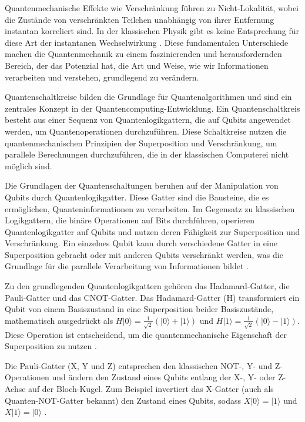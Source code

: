 Quantenmechanische Effekte wie Verschränkung führen zu Nicht-Lokalität, wobei die Zustände von verschränkten 
Teilchen unabhängig von ihrer Entfernung instantan korreliert sind. In der klassischen Physik gibt es keine 
Entsprechung für diese Art der instantanen Wechselwirkung \cite{aspect1982experimental}. Diese fundamentalen Unterschiede 
machen die Quantenmechanik zu einem faszinierenden und herausfordernden Bereich, der das Potenzial hat, 
die Art und Weise, wie wir Informationen verarbeiten und verstehen, grundlegend zu verändern.






Quantenschaltkreise bilden die Grundlage für Quantenalgorithmen und sind ein zentrales Konzept in der 
Quantencomputing-Entwicklung. Ein Quantenschaltkreis besteht aus einer Sequenz von Quantenlogikgattern, 
die auf Qubits angewendet werden, um Quantenoperationen durchzuführen. Diese Schaltkreise nutzen die 
quantenmechanischen Prinzipien der Superposition und Verschränkung, um parallele Berechnungen durchzuführen, 
die in der klassischen Computerei nicht möglich sind.

Die Grundlagen der Quantenschaltungen beruhen auf der Manipulation von Qubits durch Quantenlogikgatter. 
Diese Gatter sind die Bausteine, die es ermöglichen, Quanteninformationen zu verarbeiten. Im Gegensatz 
zu klassischen Logikgattern, die binäre Operationen auf Bits durchführen, operieren Quantenlogikgatter 
auf Qubits und nutzen deren Fähigkeit zur Superposition und Verschränkung. Ein einzelnes Qubit kann durch 
verschiedene Gatter in eine Superposition gebracht oder mit anderen Qubits verschränkt werden, was die 
Grundlage für die parallele Verarbeitung von Informationen bildet \cite{nielsen2010quantum}.

Zu den grundlegenden Quantenlogikgattern gehören das Hadamard-Gatter, die Pauli-Gatter und das CNOT-Gatter. 
Das Hadamard-Gatter (H) transformiert ein Qubit von einem Basiszustand in eine Superposition beider 
Basiszustände, mathematisch ausgedrückt als \( H|0\rangle = \frac{1}{\sqrt{2}}(|0\rangle + |1\rangle) \) 
und \( H|1\rangle = \frac{1}{\sqrt{2}}(|0\rangle - |1\rangle) \). Diese Operation ist entscheidend, um 
die quantenmechanische Eigenschaft der Superposition zu nutzen \cite{griffiths2018introduction}.

Die Pauli-Gatter (X, Y und Z) entsprechen den klassischen NOT-, Y- und Z-Operationen und ändern den 
Zustand eines Qubits entlang der X-, Y- oder Z-Achse auf der Bloch-Kugel. Zum Beispiel invertiert 
das X-Gatter (auch als Quanten-NOT-Gatter bekannt) den Zustand eines Qubits, 
sodass \( X|0\rangle = |1\rangle \) und \( X|1\rangle = |0\rangle \) \cite{nielsen2010quantum}.

